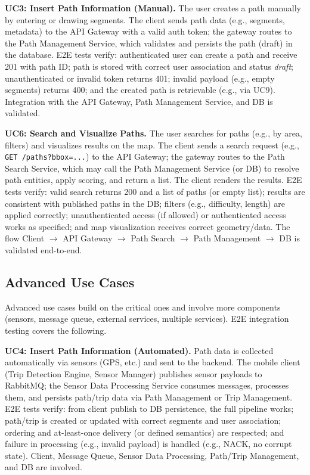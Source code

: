 \textbf{UC3: Insert Path Information (Manual).}
The user creates a path manually by entering or drawing segments. The client sends path data (e.g., segments, metadata) to the API Gateway with a valid auth token; the gateway routes to the Path Management Service, which validates and persists the path (draft) in the database. E2E tests verify: authenticated user can create a path and receive 201 with path ID; path is stored with correct user association and status \emph{draft}; unauthenticated or invalid token returns 401; invalid payload (e.g., empty segments) returns 400; and the created path is retrievable (e.g., via UC9). Integration with the API Gateway, Path Management Service, and DB is validated.

\textbf{UC6: Search and Visualize Paths.}
The user searches for paths (e.g., by area, filters) and visualizes results on the map. The client sends a search request (e.g., \texttt{GET /paths?bbox=...}) to the API Gateway; the gateway routes to the Path Search Service, which may call the Path Management Service (or DB) to resolve path entities, apply scoring, and return a list. The client renders the results. E2E tests verify: valid search returns 200 and a list of paths (or empty list); results are consistent with published paths in the DB; filters (e.g., difficulty, length) are applied correctly; unauthenticated access (if allowed) or authenticated access works as specified; and map visualization receives correct geometry/data. The flow Client $\to$ API Gateway $\to$ Path Search $\to$ Path Management $\to$ DB is validated end-to-end.

\subsection{Advanced Use Cases}
\label{subsec:advanced_use_cases}%

Advanced use cases build on the critical ones and involve more components (sensors, message queue, external services, multiple services). E2E integration testing covers the following.

\textbf{UC4: Insert Path Information (Automated).}
Path data is collected automatically via sensors (GPS, etc.) and sent to the backend. The mobile client (Trip Detection Engine, Sensor Manager) publishes sensor payloads to RabbitMQ; the Sensor Data Processing Service consumes messages, processes them, and persists path/trip data via Path Management or Trip Management. E2E tests verify: from client publish to DB persistence, the full pipeline works; path/trip is created or updated with correct segments and user association; ordering and at-least-once delivery (or defined semantics) are respected; and failure in processing (e.g., invalid payload) is handled (e.g., NACK, no corrupt state). Client, Message Queue, Sensor Data Processing, Path/Trip Management, and DB are involved.

